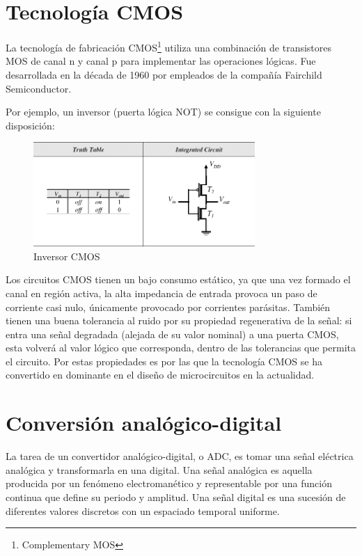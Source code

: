 \documentclass[12pt]{report} %
\begin{document}
	\section{Tecnología CMOS}
	
	La tecnología de fabricación CMOS\footnote{Complementary MOS} utiliza una combinación de transistores MOS de canal n y canal p para implementar las operaciones lógicas. Fue desarrollada en la década de 1960 por empleados de la compañía Fairchild Semiconductor\cite{cmos-fairchild}.
	
	Por ejemplo, un inversor (puerta lógica NOT) se consigue con la siguiente disposición:
	
	\begin{figure}[H]
		\includegraphics[width=0.75\textwidth]{inverter_mos.jpg}
		\caption[Inversor CMOS]{Inversor CMOS\protect\footnotemark}
		\label{fig:inverter_mos.jpg}
	\end{figure}
	
	
	Los circuitos CMOS tienen un bajo consumo estático, ya que una vez formado el canal en región activa, la alta impedancia de entrada provoca un paso de corriente casi nulo, únicamente provocado por corrientes parásitas. También tienen una buena tolerancia al ruido por su propiedad regenerativa de la señal: si entra una señal degradada (alejada de su valor nominal) a una puerta CMOS, esta volverá al valor lógico que corresponda, dentro de las tolerancias que permita el circuito. Por estas propiedades es por las que la tecnología CMOS se ha convertido en dominante en el diseño de microcircuitos en la actualidad.
	
	\section{Conversión analógico-digital}
	
	La tarea de un convertidor analógico-digital, o ADC, es tomar una señal eléctrica analógica y transformarla en una digital. Una señal analógica es aquella producida por un fenómeno electromanético y representable por una función continua que define su periodo y amplitud. Una señal digital es una sucesión de diferentes valores discretos con un espaciado temporal uniforme.
	
\end{document}

